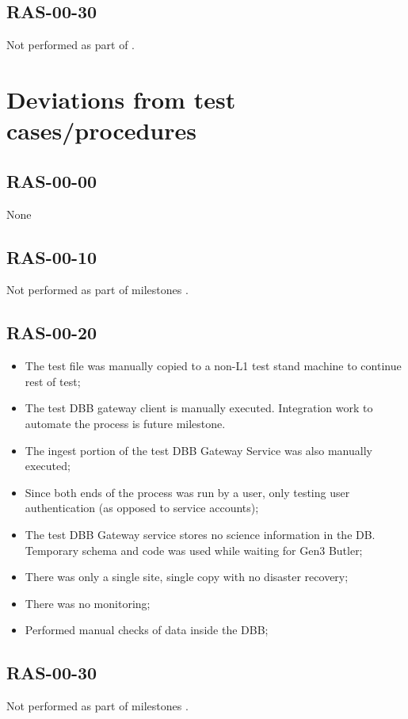 \documentclass[DM,lsstdraft,STR,toc]{lsstdoc}
\begin{document}
\subsection{RAS-00-30}
\label{sect:detail-RAS-00-30}
Not performed as part of \milestoneId{}.



\section{Deviations from test cases/procedures}
\label{sect:deviations}

\subsection{RAS-00-00}
None
\subsection{RAS-00-10}
Not performed as part of milestones \milestoneId{}.
\subsection{RAS-00-20}
\begin{itemize}
   \item{
 The test file was manually copied to a non-L1 test stand machine
to continue rest of test;
}
   \item{
 The test DBB gateway client is manually executed.  Integration
work to automate the process is future milestone.  
}
   \item{
 The ingest portion of the test DBB Gateway Service was also manually executed;
}
   \item{
 Since both ends of the process was run by a user, only testing user
authentication (as opposed to service accounts);
}
   \item{
 The test DBB Gateway service stores no science information in the
DB.  Temporary schema and code was used while waiting for Gen3 Butler;
}
   \item{
 There was only a single site, single copy with no disaster recovery;
}
   \item{
 There was no monitoring;
}
   \item{
 Performed manual checks of data inside the DBB;
}
\end{itemize}
\subsection {RAS-00-30}
Not performed as part of milestones \milestoneId{}.
\end{document}

